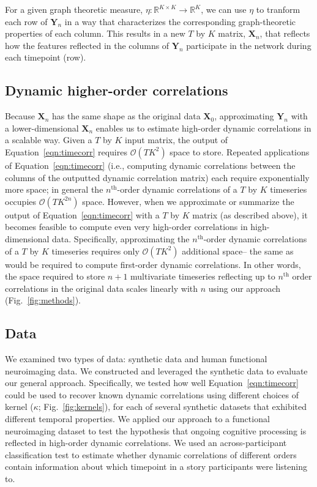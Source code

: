 \documentclass[english]{article}
\begin{document}
For a given graph theoretic measure,
$\eta: \mathbb{R}^{K \times K} \rightarrow \mathbb{R}^K$, we can use
$\eta$ to tranform each row of $\mathbf{Y}_n$ in a way that
characterizes the corresponding graph-theoretic properties of each
column.  This results in a new $T$ by $K$ matrix, $\mathbf{X}_n$, that
reflects how the features reflected in the columns of $\mathbf{Y}_n$
participate in the network during each timepoint (row).


\subsection*{Dynamic higher-order correlations}

Because $\mathbf{X}_n$ has the same shape as the original data
$\mathbf{X}_0$, approximating $\mathbf{Y}_n$ with a lower-dimensional
$\mathbf{X}_n$ enables us to estimate high-order dynamic correlations
in a scalable way.  Given a $T$ by $K$ input matrix, the output of
Equation~\ref{eqn:timecorr} requires $\mathcal{O}(TK^2)$ space to
store.  Repeated applications of Equation~\ref{eqn:timecorr} (i.e.,
computing dynamic correlations between the columns of the outputted
dynamic correlation matrix) each require exponentially more space; in
general the $n^\mathrm{th}$-order dynamic correlations of a $T$ by $K$
timeseries occupies $\mathcal{O}(TK^{2n})$ space.  However, when we
approximate or summarize the output of Equation~\ref{eqn:timecorr} with a $T$ by
$K$ matrix (as described above), it becomes feasible to compute even
very high-order correlations in high-dimensional data.  Specifically,
approximating the $n^\mathrm{th}$-order dynamic correlations of a $T$
by $K$ timeseries requires only $\mathcal{O}(TK^2)$ additional space--
the same as would be required to compute first-order dynamic
correlations. In other words, the space required to store $n+1$
multivariate timeseries reflecting up to $n^\mathrm{th}$ order
correlations in the original data scales linearly with $n$ using our
approach (Fig.~\ref{fig:methods}).

\subsection*{Data}
We examined two types of data: synthetic data and human functional
neuroimaging data.  We constructed and leveraged the synthetic data to
evaluate our general approach.  Specifically, we tested how well
Equation~\ref{eqn:timecorr} could be used to recover known dynamic
correlations using different choices of kernel ($\kappa$;
Fig.~\ref{fig:kernels}), for each of several synthetic datasets that
exhibited different temporal properties.  We applied our approach to a
functional neuroimaging dataset to test the hypothesis that ongoing
cognitive processing is reflected in high-order dynamic correlations.
We used an across-participant classification test to estimate whether
dynamic correlations of different orders contain information about
which timepoint in a story participants were listening to.
\end{document}
